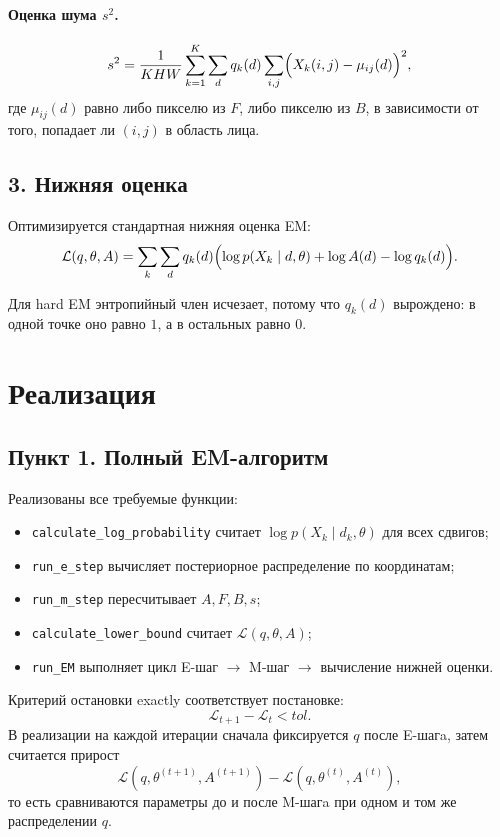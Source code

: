 \documentclass[12pt,a4paper]{article}
\begin{document}
\paragraph{Оценка шума $s^2$.}
\[
s^2 = \frac{1}{KHW} \sum_{k=1}^{K}\sum_d q_k(d)\sum_{i,j}
\Bigl(X_k(i,j) - \mu_{ij}(d)\Bigr)^2,
\]
где $\mu_{ij}(d)$ равно либо пикселю из $F$, либо пикселю из $B$, в зависимости от того, попадает ли $(i,j)$ в область лица.

\subsection*{3. Нижняя оценка}

Оптимизируется стандартная нижняя оценка EM:
\[
\mathcal{L}(q,\theta,A) =
\sum_k \sum_d q_k(d)
\Bigl(\log p(X_k \mid d,\theta) + \log A(d) - \log q_k(d)\Bigr).
\]

Для hard EM энтропийный член исчезает, потому что $q_k(d)$ вырождено: в одной точке оно равно $1$, а в остальных равно $0$.

\section{Реализация}

\subsection*{Пункт 1. Полный EM-алгоритм}

Реализованы все требуемые функции:
\begin{itemize}
    \item \texttt{calculate\_log\_probability} считает $\log p(X_k \mid d_k,\theta)$ для всех сдвигов;
    \item \texttt{run\_e\_step} вычисляет постериорное распределение по координатам;
    \item \texttt{run\_m\_step} пересчитывает $A, F, B, s$;
    \item \texttt{calculate\_lower\_bound} считает $\mathcal{L}(q,\theta,A)$;
    \item \texttt{run\_EM} выполняет цикл E-шаг $\rightarrow$ M-шаг $\rightarrow$ вычисление нижней оценки.
\end{itemize}

Критерий остановки exactly соответствует постановке:
\[
\mathcal{L}_{t+1} - \mathcal{L}_t < tol.
\]
В реализации на каждой итерации сначала фиксируется $q$ после E-шагa, затем считается прирост
\[
\mathcal{L}(q,\theta^{(t+1)},A^{(t+1)}) -
\mathcal{L}(q,\theta^{(t)},A^{(t)}),
\]
то есть сравниваются параметры до и после M-шагa при одном и том же распределении $q$.
\end{document}
